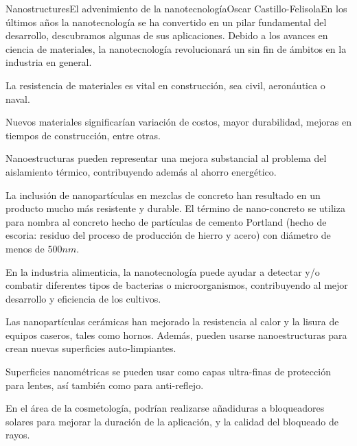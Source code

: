 \begin{article}{Nanostructures}{El advenimiento de la nanotecnolog\'ia}{Oscar Castillo-Felisola}{En los \'ultimos a\~nos la nanotecnolog\'ia se ha convertido en un pilar fundamental del desarrollo, descubramos algunas de sus aplicaciones.}
Debido a los avances en ciencia de materiales, la nanotecnolog\'ia revolucionar\'a un sin fin de \'ambitos en la industria en general.

La resistencia de materiales es vital en construcci\'on, sea civil, aeron\'autica o naval. 

Nuevos materiales significar\'ian variaci\'on de costos, mayor durabilidad, mejoras en tiempos de construcci\'on, entre otras.

Nanoestructuras pueden representar una mejora substancial al problema del aislamiento t\'ermico, contribuyendo adem\'as al ahorro energ\'etico.

La inclusi\'on de nanopart\'iculas en mezclas de concreto han resultado en un producto mucho m\'as resistente y durable. El t\'ermino de nano-concreto se utiliza para nombra al concreto hecho de part\'iculas de cemento Portland (hecho de escoria: residuo del proceso de producci\'on de hierro y acero) con di\'ametro de menos de $500 n m$.


En la industria alimenticia, la nanotecnolog\'ia puede ayudar a detectar y/o combatir diferentes tipos de bacterias o microorganismos, contribuyendo al mejor desarrollo y eficiencia de los cultivos.

Las nanopart\'iculas cer\'amicas han mejorado la resistencia al calor y la lisura de equipos caseros, tales como hornos. Adem\'as, pueden usarse nanoestructuras para crean nuevas superficies auto-limpiantes.

Superficies nanom\'etricas se pueden usar como capas ultra-finas de protecci\'on para lentes, as\'i tambi\'en como para anti-reflejo.

En el \'area de la cosmetolog\'ia, podr\'ian realizarse a\~nadiduras a bloqueadores solares para mejorar la duraci\'on de la aplicaci\'on, y la calidad del bloqueado de rayos.






\end{article}
